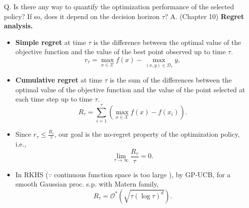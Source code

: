 \documentclass[9pt]{beamer}
\begin{document}
\begin{frame}
  Q. Is there any way to quantify the optimization performance of the selected policy? If so, does it depend on the decision horizon $\tau$?
  \newline
  A. (Chapter 10) \textbf{Regret analysis.}
  \begin{itemize}
    \item \textbf{Simple regret} at time $\tau$ is the difference between the optimal value of the objective function 
    and the value of the best point observed up to time $\tau.$
    \[
      r_\tau = \max_{x \in \mathcal{X}} f(x) - \max_{(x, y) \in \mathcal{D}_\tau} y,
    \]
    \item \textbf{Cumulative regret} at time $\tau$ is the sum of the differences between the optimal value of the objective function 
    and the value of the point selected at each time step up to time $\tau.$
    \[
      R_\tau = \sum_{i=1}^\tau \left(\max_{x \in \mathcal{X}} f(x) - f(x_i)\right).
    \]
    \item Since $r_\tau \le \frac{R_\tau}{\tau}$, our goal is the no-regret property of the optimization policy, i.e.,
    \[
      \lim_{\tau \to \infty} \frac{R_\tau}{\tau} = 0.
    \]
    \item[$\Rightarrow$] In RKHS ($\because$ continuous function space is too large ), by GP-UCB, for a smooth Gaussian proc. s.p. with Matern family,
    \[
      R_\tau = \mathcal{O}^*(\sqrt{\tau (\log \tau)^d}).
    \]
  \end{itemize}
\end{frame}
\end{document}
